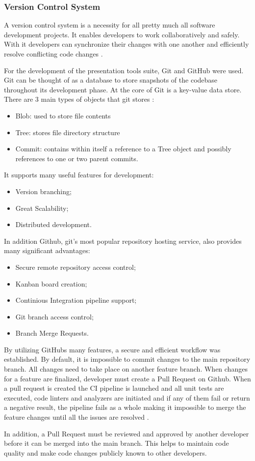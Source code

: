 \documentclass[12pt, fleqn, a4paper]{article}
\begin{document}
\subsubsection{Version Control System}
A version control system is a necessity for all pretty much all software development projects. It enables developers to work collaboratively and safely. With it developers can synchronize their changes with one another and efficiently resolve conflicting code changes \citep{loeliger_mccullough_2012}.\par
For the development of the presentation tools suite, Git and GitHub were used. 
Git can be thought of as a database to store snapshots of the codebase throughout its development phase. At the core of Git is a key-value data store. 
There are 3 main types of objects that git stores \citep{progit}:
\begin{itemize}
	\item Blob: used to store file contents
	\item Tree: stores file directory structure
	\item Commit: contains within itself a reference to a Tree object and possibly references to one or two parent commits.
\end{itemize}
It supports many useful features for development:
\begin{itemize}
	\item Version branching;
	\item Great Scalability;
	\item Distributed development.
\end{itemize}
In addition Github, git's most popular repository hosting service, also provides many significant advantages:
\begin{itemize}
	\item Secure remote repository access control;
	\item Kanban board creation;
	\item Continious Integration pipeline support;
	\item Git branch access control;
	\item Branch Merge Requests.
\end{itemize}
By utilizing GitHubs many features, a secure and efficient workflow was established. By default, it is impossible to commit changes to the main repository branch. All changes need to take place on another feature branch. When changes for a feature are finalized, developer must create a Pull Request on Github. When a pull request is created the CI pipeline is launched and all unit tests are executed, code linters and analyzers are initiated and if any of them fail or return a negative result, the pipeline fails as a whole making it impossible to merge the feature changes until all the issues are resolved \citep{gitteams}.\par
In addition, a Pull Request must be reviewed and approved by another developer before it can be merged into the main branch. This helps to maintain code quality and make code changes publicly known to other developers.
\end{document}
